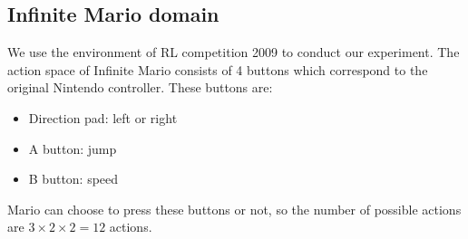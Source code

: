 

\subsection{Infinite Mario domain}

We use the environment of RL competition 2009 to conduct our experiment.
The action space of Infinite Mario consists of 4 buttons which correspond
to the original Nintendo controller.
These buttons are:
\begin{itemize}
\item Direction pad: left or right
\item A button: jump
\item B button: speed
\end{itemize}
Mario can choose to press these buttons or not, so
the number of possible actions are $3 \times 2 \times 2 = 12$ actions.  

